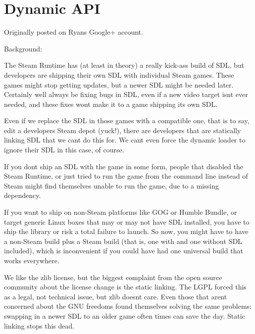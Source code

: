 \chapter{Dynamic API }
\hypertarget{md__mono_runtime_2extern_2sdl_2docs_2_r_e_a_d_m_e-dynapi}{}\label{md__mono_runtime_2extern_2sdl_2docs_2_r_e_a_d_m_e-dynapi}
\label{md__mono_runtime_2extern_2sdl_2docs_2_r_e_a_d_m_e-dynapi_autotoc_md1298}%
%


Originally posted on Ryan\textquotesingle{}s Google+ account.

Background:\+


\begin{DoxyItemize}
\item The Steam Runtime has (at least in theory) a really kick-\/ass build of SDL, but developers are shipping their own SDL with individual Steam games. These games might stop getting updates, but a newer SDL might be needed later. Certainly we\textquotesingle{}ll always be fixing bugs in SDL, even if a new video target isn\textquotesingle{}t ever needed, and these fixes won\textquotesingle{}t make it to a game shipping its own SDL.
\item Even if we replace the SDL in those games with a compatible one, that is to say, edit a developer\textquotesingle{}s Steam depot (yuck!), there are developers that are statically linking SDL that we can\textquotesingle{}t do this for. We can\textquotesingle{}t even force the dynamic loader to ignore their SDL in this case, of course.
\item If you don\textquotesingle{}t ship an SDL with the game in some form, people that disabled the Steam Runtime, or just tried to run the game from the command line instead of Steam might find themselves unable to run the game, due to a missing dependency.
\item If you want to ship on non-\/\+Steam platforms like GOG or Humble Bundle, or target generic Linux boxes that may or may not have SDL installed, you have to ship the library or risk a total failure to launch. So now, you might have to have a non-\/\+Steam build plus a Steam build (that is, one with and one without SDL included), which is inconvenient if you could have had one universal build that works everywhere.
\item We like the zlib license, but the biggest complaint from the open source community about the license change is the static linking. The LGPL forced this as a legal, not technical issue, but zlib doesn\textquotesingle{}t care. Even those that aren\textquotesingle{}t concerned about the GNU freedoms found themselves solving the same problems:\+ swapping in a newer SDL to an older game often times can save the day. Static linking stops this dead.
\end{DoxyItemize}


